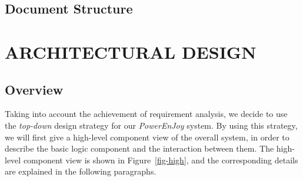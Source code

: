 \documentclass[a4paper,11pt]{article}
\begin{document}
	\subsection{Document Structure}
\newpage
\section{ARCHITECTURAL DESIGN}
	\subsection{Overview}
	Taking into account the achievement of requirement analysis, we decide to use the \textsl{top-down} design strategy for our \textsl{PowerEnJoy} system. By using this strategy, we will first give a high-level component view of the overall system, in order to describe the basic logic component and the interaction between them. The high-level component view is shown in Figure~\ref{fig-high}, and the corresponding details are explained in the following paragraphs.
	
\end{document}
